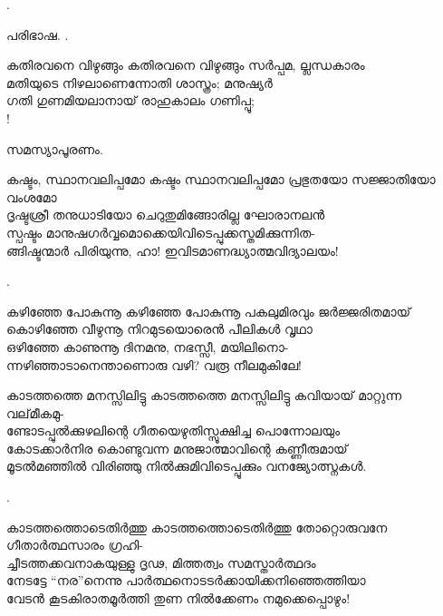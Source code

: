 \begin{enumerate}
.

പരിഭാഷ.  .

\begin{slokam}{\VMl}{\UN}{കതിരവനെ വിഴുങ്ങും}
കതിരവനെ വിഴുങ്ങും സർപ്പമ, ല്ലന്ധകാരം \\
മതിയുടെ നിഴലാണെന്നോതി ശാസ്ത്രം; മനുഷ്യർ \\
ഗതി ഗുണമിയലാനായ് രാഹുകാലം ഗണിപ്പൂ; \\
!
\end{slokam}



സമസ്യാപൂരണം. 


\begin{slokam}{\VSv}{\KA}{കഷ്ടം, സ്ഥാനവലിപ്പമോ}
കഷ്ടം സ്ഥാനവലിപ്പമോ പ്രഭുതയോ സജ്ജാതിയോ വംശമോ\\
ദൃഷ്ടശ്രീ തനുധാടിയോ ചെറുതുമിങ്ങോരില്ല ഘോരാനലൻ\\
സ്പഷ്ടം മാനുഷഗർവ്വമൊക്കെയിവിടെപ്പുക്കസ്തമിക്കുന്നിത-\\
ങ്ങിഷ്ടന്മാർ പിരിയുന്നു, ഹാ! ഇവിടമാണദ്ധ്യാത്മവിദ്യാലയം!
\end{slokam}


.

\begin{slokam}{\VSk}{\KND}{കഴിഞ്ഞേ പോകുന്നൂ}
കഴിഞ്ഞേ പോകുന്നൂ പകലുമിരവും ജർജ്ജരിതമായ്‌\\
കൊഴിഞ്ഞേ വീഴുന്നൂ നിറമുടയൊരെൻ പീലികള്‍ വൃഥാ\\
ഒഴിഞ്ഞേ കാണുന്നൂ ദിനമനു, നഭസ്സീ, മയിലിനൊ-\\
ന്നഴിഞ്ഞാടാനെന്താണൊരു വഴി? വരൂ നീലമുകിലേ!
\end{slokam}


\begin{slokam}{\VSv}{\VRV}{കാടത്തത്തെ മനസ്സിലിട്ടു}
കാടത്തത്തെ മനസ്സിലിട്ടു കവിയായ്‌ മാറ്റുന്ന വല്‌മീകമു-\\
ണ്ടോടപ്പുൽക്കുഴലിന്റെ ഗീതയെഴുതിസ്സൂക്ഷിച്ച പൊന്നോലയും\\
കോടക്കാർനിര കൊണ്ടുവന്ന മനുജാത്മാവിന്റെ കണ്ണീരുമായ്‌\\
മൂടൽമഞ്ഞിൽ വിരിഞ്ഞു നിൽക്കുമിവിടെപ്പൂക്കും വനജ്യോത്സ്നകള്‍.
\end{slokam}



.


\begin{slokam}{\VSv}{\NNM}{കാടത്തത്തൊടെതിർത്തു}
കാടത്തത്തൊടെതിർത്തു തോറ്റൊരുവനേ ഗീതാർത്ഥസാരം ഗ്രഹി-\\
ച്ചീടത്തക്കവനാകയുള്ളു ദൃഢ, മിത്തത്വം സമസ്താർത്ഥദം\\
നേടട്ടേ ``നര''നെന്നു പാർത്ഥനൊടടർക്കായിക്കനിഞ്ഞെത്തിയാ\\
വേടൻ കൂടകിരാതമൂർത്തി തുണ നിൽക്കേണം നമുക്കെപ്പൊഴും!
\end{slokam}


\end{enumerate}
